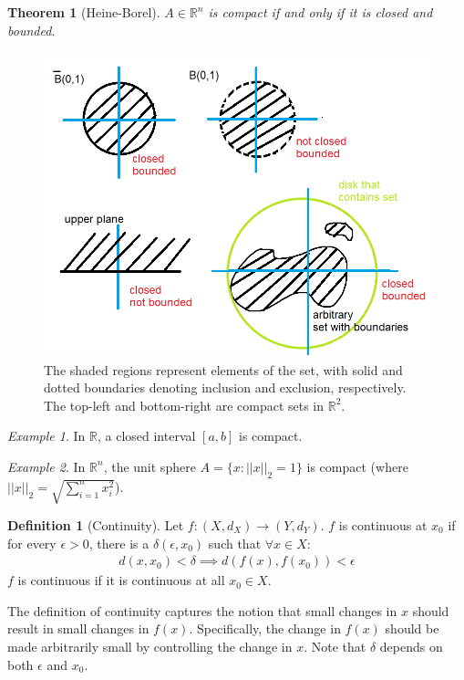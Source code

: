 \documentclass[11pt]{article}
\newcommand{\R}{\ensuremath{\mathbb R}}
\newcommand{\e}{\epsilon}
\theoremstyle{plain}
\newtheorem{thm}{Theorem}[section]
\theoremstyle{definition}
\newtheorem{defi}{Definition}[section]
\theoremstyle{remark}
\newtheorem{exm}{Example}[section]
\begin{document}
\begin{thm}[Heine-Borel]
    $A \in \R^n$ is compact if and only if it is closed and bounded.
\end{thm}
\clearpage
\begin{figure}
    \centering
    \includegraphics[width=\linewidth]{figures/compact.png}
    \caption{The shaded regions represent elements of the set, with solid and dotted boundaries denoting inclusion and exclusion, respectively. The top-left and bottom-right are compact sets in $\R^2$.}
\end{figure}
\begin{exm}
    In $\R$, a closed interval $[a, b]$ is compact.
\end{exm}
\begin{exm}
    In $\R^n$, the unit sphere $A = \{x : ||x||_2 = 1\}$ is compact (where $||x||_2 = \sqrt{\sum_{i=1}^n x_i^2}$).
\end{exm}
\begin{defi}[Continuity]
    Let $f: (X, d_X) \rightarrow (Y, d_Y)$. $f$ is continuous at $x_0$ if for every $\e > 0$, there is a $\delta(\e, x_0)$ such that $\forall x \in X$:
    \begin{align*}
        d(x, x_0) < \delta \implies d(f(x), f(x_0)) < \e
    \end{align*}
    $f$ is continuous if it is continuous at all $x_0 \in X$.
\end{defi}
The definition of continuity captures the notion that small changes in $x$ should result in small changes in $f(x)$. Specifically, the change in $f(x)$ should be made arbitrarily small by controlling the change in $x$. Note that $\delta$ depends on both $\e$ and $x_0$. 
\end{document}
